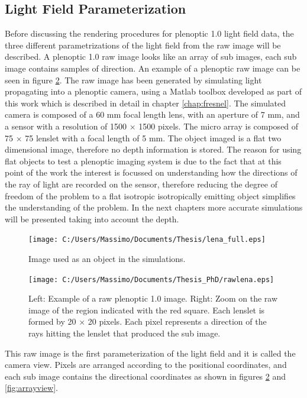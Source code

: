 \subsection{Light Field Parameterization}
\label{sec:LFparam}
Before discussing the rendering procedures for plenoptic 1.0 light field data, the three different parametrizations of the light field from the raw image will be described. A plenoptic 1.0 raw image looks like an array of sub images, each sub image contains samples of direction. An example of a plenoptic raw image can be seen in figure \ref{fig:rawlena10}. The raw image has been generated by simulating light propagating into a plenoptic camera, using a Matlab toolbox developed as part of this work which is described in detail in chapter \ref{chap:fresnel}. The simulated camera is composed of a 60 mm focal length lens, with an aperture of 7 mm, and a sensor with a resolution of 1500 $\times$ 1500 pixels. The micro array is composed of 75 $\times$ 75 lenslet with a focal length of 5 mm. The object imaged is a flat two dimensional image, therefore no depth information is stored. The reason for using flat objects to test a plenoptic imaging system is due to the fact that at this point of the work the interest is focussed on  understanding how the directions of the ray of light are recorded on the sensor, therefore reducing the degree of freedom of the problem to a flat isotropic isotropically emitting object simplifies the understanding of the problem. In the next chapters more accurate simulations will be presented taking into account the depth.
\begin{figure}[H]
	\centering
	\texttt{[image: C:/Users/Massimo/Documents/Thesis/lena\_full.eps]}
	\caption{\label{fig:lenafull} Image used as an object in the simulations.}
\end{figure}
\begin{figure}[H]
	\centering
	\texttt{[image: C:/Users/Massimo/Documents/Thesis\_PhD/rawlena.eps]}
	\caption{\label{fig:rawlena10}Left: Example of a raw plenoptic 1.0 image. Right: Zoom on the raw image of the region indicated with the red square. Each lenslet is formed by 20 $\times$ 20 pixels. Each pixel represents a direction of the rays hitting the lenslet that produced the sub image.  }
\end{figure}
This raw image is the first parameterization of the light field and it is called the camera view. Pixels are arranged according to the positional coordinates, and each sub image contains the directional coordinates as shown in figures \ref{fig:rawlena10} and \ref{fig:arrayview}. \\

